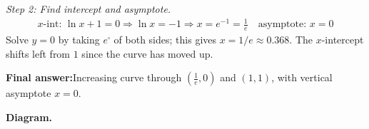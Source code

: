 \documentclass[11pt]{article}
\begin{document}
\textit{Step 2: Find intercept and asymptote.}
\[\begin{gathered}
x\text{-int: } \ln x + 1 = 0 \Rightarrow \ln x = -1 \Rightarrow x = e^{-1} = \tfrac{1}{e} \quad \text{asymptote: } x = 0
\end{gathered}\]
Solve \( y = 0 \) by taking \( e^{\square} \) of both sides; this gives \( x = 1/e \approx 0.368 \). The \( x \)-intercept shifts left from \( 1 \) since the curve has moved up.

\begin{answerbox}
\textbf{Final answer:}\quad Increasing curve through \(\displaystyle (\tfrac{1}{e}, 0)\) and \(\displaystyle (1, 1)\), with vertical asymptote \(\displaystyle  x = 0 \).
\end{answerbox}
\textbf{Diagram.}

\begin{center}
\end{center}
\end{document}
